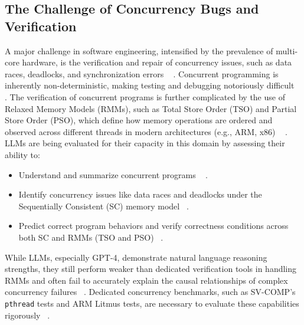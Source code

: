 \subsection*{The Challenge of Concurrency Bugs and Verification}
A major challenge in software engineering, intensified by the prevalence of multi-core hardware, is the verification and repair of concurrency issues, such as data races, deadlocks, and synchronization errors ~\cite{jain2025,abbaspour2016}
. Concurrent programming is inherently non-deterministic, making testing and debugging notoriously difficult ~\cite{jain2025,chang2021,abbaspour2016}
.
The verification of concurrent programs is further complicated by the use of Relaxed Memory Models (RMMs), such as Total Store Order (TSO) and Partial Store Order (PSO), which define how memory operations are ordered and observed across different threads in modern architectures (e.g., ARM, x86) ~\cite{jain2025}
.
LLMs are being evaluated for their capacity in this domain by assessing their ability to: \begin{itemize} \item Understand and summarize concurrent programs ~\cite{jain2025}
. \item Identify concurrency issues like data races and deadlocks under the Sequentially Consistent (SC) memory model ~\cite{jain2025}. \item Predict correct program behaviors and verify correctness conditions across both SC and RMMs (TSO and PSO) ~\cite{jain2025}. \end{itemize} While LLMs, especially GPT-4, demonstrate natural language reasoning strengths, they still perform weaker than dedicated verification tools in handling RMMs and often fail to accurately explain the causal relationships of complex concurrency failures ~\cite{jain2025}. Dedicated concurrency benchmarks, such as SV-COMP's \texttt{pthread} tests and ARM Litmus tests, are necessary to evaluate these capabilities rigorously ~\cite{jain2025}.